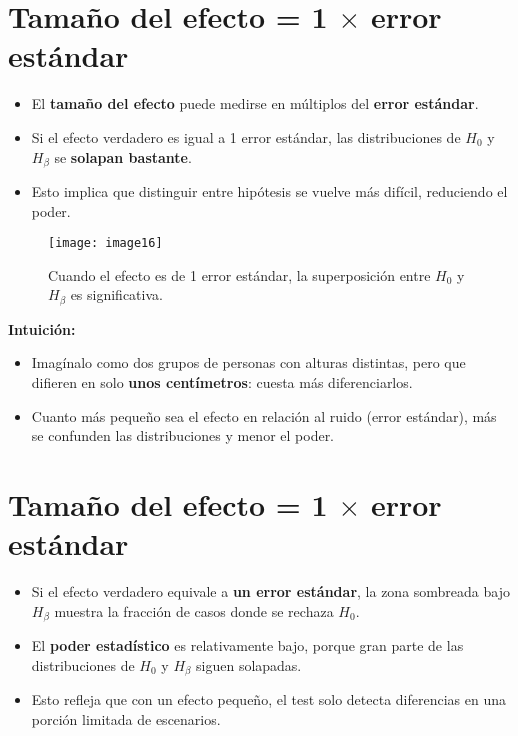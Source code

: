 \documentclass[12pt]{article}
\begin{document}
\section*{\noindent\textbf{Tamaño del efecto = 1 $\times$ error estándar}}

\begin{itemize}
    \item El \textbf{tamaño del efecto} puede medirse en múltiplos del \textbf{error estándar}.
    \item Si el efecto verdadero es igual a 1 error estándar, las distribuciones de $H_0$ y $H_\beta$ se \textbf{solapan bastante}.
    \item Esto implica que distinguir entre hipótesis se vuelve más difícil, reduciendo el poder.
\end{itemize}

\begin{figure}[H]
    \centering
    \texttt{[image: image16]}
    \caption{\footnotesize Cuando el efecto es de 1 error estándar, la superposición entre $H_0$ y $H_\beta$ es significativa.}
\end{figure}

\textbf{Intuición:}
\begin{itemize}
    \item Imagínalo como dos grupos de personas con alturas distintas, pero que difieren en solo \textbf{unos centímetros}: cuesta más diferenciarlos.
    \item Cuanto más pequeño sea el efecto en relación al ruido (error estándar), más se confunden las distribuciones y menor el poder.
\end{itemize}

\section*{\noindent\textbf{Tamaño del efecto = 1 $\times$ error estándar}}

\begin{itemize}
    \item Si el efecto verdadero equivale a \textbf{un error estándar}, la zona sombreada bajo $H_\beta$ muestra la fracción de casos donde se rechaza $H_0$.
    \item El \textbf{poder estadístico} es relativamente bajo, porque gran parte de las distribuciones de $H_0$ y $H_\beta$ siguen solapadas.
    \item Esto refleja que con un efecto pequeño, el test solo detecta diferencias en una porción limitada de escenarios.
\end{itemize}
\end{document}
